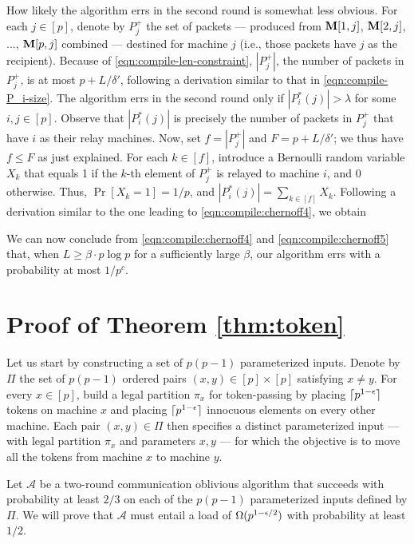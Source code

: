 \documentclass[sigconf]{acmart}
\def\vgap{\vspace{0mm}}
\def\A{\mathcal{A}}
\begin{document}
\vgap

How likely the algorithm errs in the second round is somewhat less obvious. For each $j \in [p]$, denote by $P^+_j$ the set of packets --- produced from $\mathbf{M}[1,j]$, $\mathbf{M}[2,j]$, ..., $\mathbf{M}[p,j]$ combined --- destined for machine $j$ (i.e., those packets have $j$ as the recipient). Because of \eqref{eqn:compile-len-constraint}, $|P^+_j|$, the number of packets in $P^+_j$, is at most $p + L/\delta'$, following a derivation similar to that in \eqref{eqn:compile-P_i-size}. The algorithm errs in the second round only if $|P^*_i(j)| > \lambda$ for some $i, j \in [p]$. Observe that $|P^*_i(j)|$ is precisely the number of packets in $P^+_j$ that have $i$ as their relay machines. Now, set $f = |P^+_j|$ and $F = p + L / \delta'$; we thus have $f \le F$ as just explained. For each $k \in [f]$, introduce a Bernoulli random variable $X_k$ that equals 1 if the $k$-th element of $P^+_j$ is relayed to machine $i$, and 0 otherwise. Thus, $\Pr[X_k = 1] = 1/p$, and $|P^*_i(j)| = \sum_{k \in [f]} X_k$. Following a derivation similar to the one leading to \eqref{eqn:compile:chernoff4}, we obtain

We can now conclude from \eqref{eqn:compile:chernoff4} and \eqref{eqn:compile:chernoff5} that, when $L \ge \beta \cdot p \log p$ for a sufficiently large $\beta$, our algorithm errs with a probability at most $1 / p^c$.

\section{Proof of Theorem \ref{thm:token}} \label{app:thm:token}

Let us start by constructing a set of $p(p-1)$ parameterized inputs. Denote by $\Pi$ the set of $p(p-1)$ ordered pairs $(x, y) \in [p] \times [p]$ satisfying $x \ne y$. For every $x \in [p]$, build a legal partition $\pi_x$ for token-passing by placing $\lceil p^{1-\epsilon} \rceil$ tokens on machine $x$ and placing $\lceil p^{1-\epsilon} \rceil$ innocuous elements on every other machine. Each pair $(x, y) \in \Pi$ then specifies a distinct parameterized input --- with legal partition $\pi_x$ and parameters $x, y$ --- for which the objective is to move all the tokens from machine $x$ to machine $y$.

\vgap

Let $\A$ be a two-round communication oblivious algorithm that succeeds with probability at least $2/3$ on each of the $p(p-1)$ parameterized inputs defined by $\Pi$. We will prove that $\A$ must entail a load of $\Omega(p^{1-\epsilon/2})$ with probability at least $1/2$.
\end{document}
